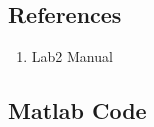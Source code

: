 \documentclass{article}
\begin{document}
\subsection{References}
\begin{enumerate}
	\item Lab2 Manual
\end{enumerate}

\subsection{Matlab Code}
\vspace*{1em}

\begin{minipage}{0.1\linewidth}
\end{minipage}
\begin{minipage}{0.8\linewidth}
    \inputminted{matlab}{p2.m}
\end{minipage}
\end{document}
